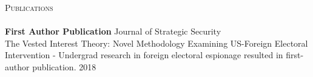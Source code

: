 \documentclass[a4paper]{article}
\newcommand{\lineunder} {
    \vspace*{-8pt} \\
    \hspace*{-18pt} \hrulefill \\
}
\newcommand{\header} [1] {
    {\hspace*{-18pt}\vspace*{6pt} \textsc{#1}}
    \vspace*{-6pt} \lineunder
}
\begin{document}
\header{Publications}
\textbf{First Author Publication} \hfill Journal of Strategic Security\\
\textquotedbl{}The Vested Interest Theory: Novel Methodology Examining US-Foreign Electoral Intervention\textquotedbl{} - Undergrad research in foreign electoral espionage resulted in first-author publication. \hfill 2018\\
\vspace*{2mm}

\ 
\end{document}
